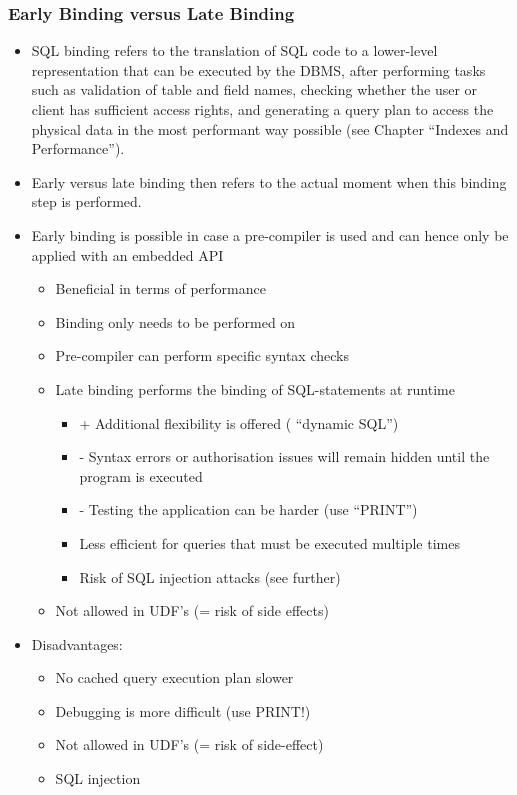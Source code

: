 \documentclass{report}
\begin{document}
    \subsubsection{Early Binding versus Late Binding}
    \begin{itemize} 
        \item SQL binding refers to the translation of SQL code to a lower-level representation that can be executed by the DBMS, after performing tasks such as validation of table and field names, checking whether the user or client has sufficient access rights, and generating a query plan to access the physical data in the most performant way possible (see Chapter ``Indexes and Performance'').
        \item Early versus late binding then refers to the actual moment when this binding step is performed.
        \item Early binding is possible in case a pre-compiler is used and can hence only be applied with an embedded API
            \begin{itemize} 
                \item Beneficial in terms of performance
                \item Binding only needs to be performed on
                \item Pre-compiler can perform specific syntax checks
                \item Late binding performs the binding of SQL-statements at runtime
                    \begin{itemize} 
                        \item + Additional flexibility is offered ( ``dynamic SQL'')
                        \item - Syntax errors or authorisation issues will remain hidden until the program is executed
                        \item - Testing the application can be harder (use ``PRINT'')
                        \item Less efficient for queries that must be executed multiple times
                        \item Risk of SQL injection attacks (see further)
                    \end{itemize}
                \item Not allowed in UDF's (= risk of side effects)
            \end{itemize}
        \item Disadvantages:
            \begin{itemize} 
                \item No cached query execution plan \textrightarrow slower
                \item Debugging is more difficult (use PRINT!)
                \item Not allowed in UDF's (= risk of side-effect)
                \item SQL injection
            \end{itemize}
    \end{itemize}
\end{document}
